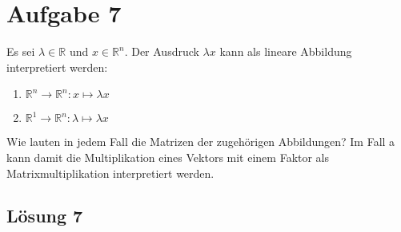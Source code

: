 \documentclass[main.tex]{subfiles}
\begin{document}
\section{Aufgabe 7}
Es sei $\lambda \in \mathbb{R}$ und $x \in \mathbb{R}^n$. Der Ausdruck $\lambda x$ kann als lineare Abbildung interpretiert werden:
\begin{enumerate}
    \item $\mathbb{R}^n \to \mathbb{R}^n : x \mapsto \lambda x$
    \item $\mathbb{R}^1 \to \mathbb{R}^n : \lambda \mapsto \lambda x$
\end{enumerate}

Wie lauten in jedem Fall die Matrizen der zugehörigen Abbildungen? Im Fall a\) kann damit die
Multiplikation eines Vektors mit einem Faktor als Matrixmultiplikation interpretiert werden.

\subsection{Lösung 7}
\end{document}
